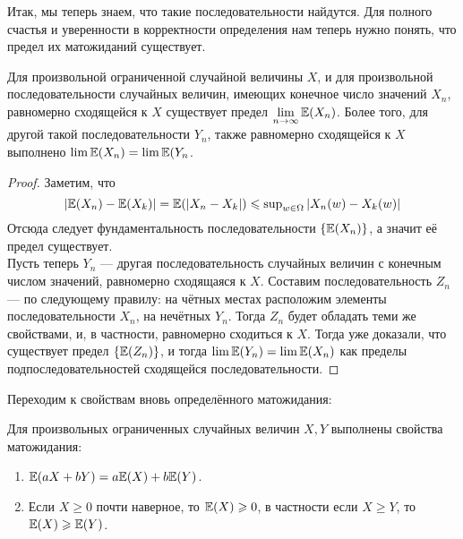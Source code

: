 \begin{comment}
    Если не появилось понимания того что произошло, очень рекомендую посмотреть это доказательство в
    \href{https://drive.google.com/file/d/1JuT1me8rnYAElmNJomesxIowCqU3LlEv/view}{лекции}, там оно получилось
    на редкость удачное. Таймкод: $26:22$.
\end{comment}
Итак, мы теперь знаем, что такие последовательности найдутся. Для полного счастья и уверенности в корректности определения
нам теперь нужно понять, что предел их матожиданий существует.
\begin{proposal}
    Для произвольной ограниченной случайной величины $X$, и для произвольной последовательности случайных величин, имеющих
    конечное число значений $X_n$, равномерно сходящейся к $X$ существует предел $\lim\limits_{n \to \infty} \mathbb{E}(X_n)$.
    Более того, для другой такой последовательности $Y_n$, также равномерно сходящейся к $X$ выполнено $\lim \mathbb{E}(X_n) = \lim \mathbb{E}(Y_n$.
\end{proposal}
\begin{proof}
    Заметим, что
    \[
        |\mathbb{E}(X_n) - \mathbb{E}(X_k)| = \mathbb{E}(|X_n - X_k|) \leqslant
        \operatorname{\mathop{\mathrm{sup}}}_{w \in \Omega}|X_n(w) - X_k(w)|
    \]
    Отсюда следует фундаментальность последовательности $\{\mathbb{E}(X_n)\}$, а значит её предел существует.\\
    Пусть теперь $Y_n$ --- другая последовательность случайных величин с конечным числом значений, равномерно сходящаяся к
    $X$. Составим последовательность $Z_n$ --- по следующему правилу: на чётных местах расположим элементы последовательности
    $X_n$, на нечётных $Y_n$. Тогда $Z_n$ будет обладать теми же свойствами, и, в частности, равномерно сходиться к $X$.
    Тогда уже доказали, что существует предел $\{\mathbb{E}(Z_n)\}$, и тогда $\lim \mathbb{E}(Y_n) = \lim \mathbb{E}(X_n)$ как пределы
    подпоследовательностей сходящейся последовательности.
\end{proof}
Переходим к свойствам вновь определённого матожидания:
\begin{proposal}
    Для произвольных ограниченных случайных величин $X, Y$ выполнены свойства матожидания:
    \begin{enumerate}
        \item $\mathbb{E}(aX + bY) = a\mathbb{E}(X) + b\mathbb{E}(Y)$.
        \item Если $X \geq 0$ почти наверное, то $\mathbb{E}(X) \geqslant 0$, в частности если $X \geq Y$, то $\mathbb{E}(X) \geqslant \mathbb{E}(Y)$.
    \end{enumerate}
\end{proposal}
